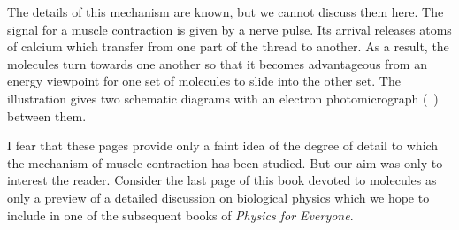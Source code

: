 The details of this mechanism are known, but we cannot discuss them here. The signal for a muscle contraction is given by a nerve pulse. Its arrival releases atoms of cal­cium which transfer from one part of the thread to another. As a result, the molecules turn towards one another so that it becomes advantageous from an energy viewpoint for one set of molecules to slide into the other set. The illustration gives two schematic diagrams with an elec­tron photomicrograph (~) between them.

I fear that these pages provide only a faint idea of the degree of detail to which the mechanism of muscle con­traction has been studied. But our aim was only to in­terest the reader. Consider the last page of this book de­voted to molecules as only a preview of a detailed discus­sion on biological physics which we hope to include in one of the subsequent books of \emph{Physics for Everyone}.